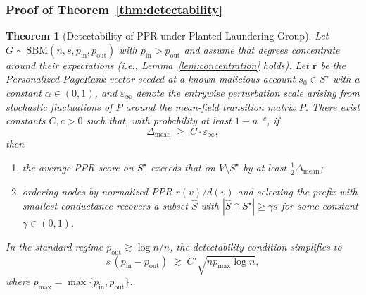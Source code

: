 \documentclass[11pt,english]{article}
\newtheorem{theorem}{Theorem}[section]
\newcommand{\lc}[1]{{\textsf{\textcolor{blue}{[LC: #1]}}}}
\begin{document}
\subsubsection{Proof of Theorem~\ref{thm:detectability}}
\begin{theorem}[Detectability of PPR under Planted Laundering Group]
Let $G\sim\mathrm{SBM}(n,s,p_{\mathrm{in}},p_{\mathrm{out}})$ with $p_{\mathrm{in}}>p_{\mathrm{out}}$ and assume that degrees concentrate around their expectations (i.e., Lemma~\ref{lem:concentration} holds). Let $\mathbf{r}$ be the Personalized PageRank vector seeded at a known malicious account $s_0\in S^\star$ with a constant $\alpha\in(0,1)$, and $\varepsilon_{\infty}$ denote the entrywise perturbation scale arising from stochastic fluctuations of $P$ around the mean-field transition matrix $\bar P$. There exist constants $C,c>0$ such that, with probability at least $1-n^{-c}$, if
\[
\Delta_{\mathrm{mean}} \;\ge\; C\cdot\varepsilon_{\infty},
\]
then
\begin{enumerate}
    \item the average PPR score on $S^\star$ exceeds that on $V\setminus S^\star$ by at least $\tfrac{1}{2}\Delta_{\mathrm{mean}}$;
    \item ordering nodes by normalized PPR $r(v)/d(v)$ and selecting the prefix with smallest conductance recovers a subset $\widehat S$ with $|\widehat S\cap S^\star|\ge\gamma s$ for some constant $\gamma\in(0,1)$.
\end{enumerate}
In the standard regime $p_{\mathrm{out}}\gtrsim \log n/n$,
the detectability condition simplifies to
\[
s\,(p_{\mathrm{in}}-p_{\mathrm{out}})
\;\gtrsim\;
C'\sqrt{n p_{\max}\log n},
\]
where $p_{\max}=\max\{p_{\mathrm{in}},p_{\mathrm{out}}\}$. 
\end{theorem}
\end{document}
